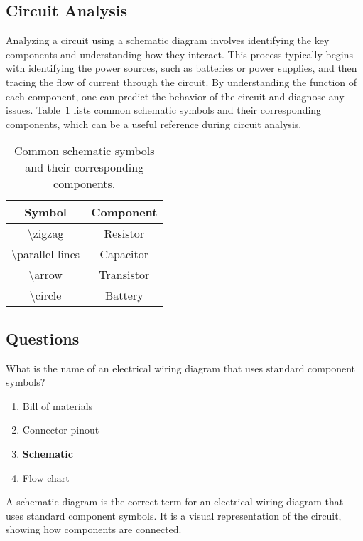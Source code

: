 \subsection*{Circuit Analysis}
Analyzing a circuit using a schematic diagram involves identifying the key components and understanding how they interact. This process typically begins with identifying the power sources, such as batteries or power supplies, and then tracing the flow of current through the circuit. By understanding the function of each component, one can predict the behavior of the circuit and diagnose any issues. Table~\ref{tab:schematic_symbols} lists common schematic symbols and their corresponding components, which can be a useful reference during circuit analysis.

\begin{table}[h!]
    \centering
    \begin{tabular}{|c|c|}
        \hline
        \textbf{Symbol} & \textbf{Component} \\
        \hline
        \textbackslash zigzag & Resistor \\
        \hline
        \textbackslash parallel lines & Capacitor \\
        \hline
        \textbackslash arrow & Transistor \\
        \hline
        \textbackslash circle & Battery \\
        \hline
    \end{tabular}
    \caption{Common schematic symbols and their corresponding components.}
    \label{tab:schematic_symbols}
\end{table}

\subsection*{Questions}
\begin{tcolorbox}[colback=gray!10!white,colframe=black!75!black,title={T6C01}]
    What is the name of an electrical wiring diagram that uses standard component symbols?
    \begin{enumerate}[label=\Alph*,noitemsep]
        \item Bill of materials
        \item Connector pinout
        \item \textbf{Schematic}
        \item Flow chart
    \end{enumerate}
\end{tcolorbox}
A schematic diagram is the correct term for an electrical wiring diagram that uses standard component symbols. It is a visual representation of the circuit, showing how components are connected.

